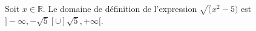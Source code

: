 Soit $x\in \mathbb R$. Le domaine de définition de l'expression $\sqrt(x^2-5)$ est $]-\infty,-\sqrt{5}[\cup ]\sqrt{5},+\infty[$.

\begin{reponses}
\end{reponses}

